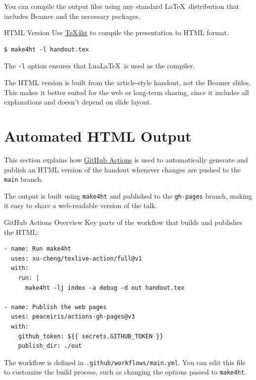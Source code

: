 You can compile the output files using any standard \LaTeX\ distribution that includes Beamer and the necessary packages.

\begin{frame}[fragile]{HTML Version}
  Use \href{https://www.tug.org/tex4ht/}{\TeX4ht} to compile the presentation to HTML format. 
\begin{verbatim}
$ make4ht -l handout.tex    
\end{verbatim}

The \verb|-l| option  ensures that Lua\LaTeX\ is used as the compiler. 
\end{frame}


The HTML version is built from the article-style handout, not the Beamer slides.
This makes it better suited for the web or long-term sharing, since it includes
all explanations and doesn’t depend on slide layout.

\section{Automated HTML Output}

This section explains how \href{https://docs.github.com/en/actions/writing-workflows/quickstart}{GitHub Actions}
is used to automatically generate and publish an HTML version of the handout whenever changes are pushed to the \texttt{main} branch.

The output is built using \texttt{make4ht} and published to the \texttt{gh-pages} branch,
making it easy to share a web-readable version of the talk.

\begin{frame}[fragile]{GitHub Actions Overview}
Key parts of the workflow that builds and publishes the HTML:

\begin{verbatim}
- name: Run make4ht
  uses: xu-cheng/texlive-action/full@v1
  with:
    run: |
      make4ht -lj index -a debug -d out handout.tex

- name: Publish the web pages
  uses: peaceiris/actions-gh-pages@v3
  with:
    github_token: ${{ secrets.GITHUB_TOKEN }}
    publish_dir: ./out
\end{verbatim}

\end{frame}


The workflow is defined in \texttt{.github/workflows/main.yml}.
You can edit this file to customize the build process, such as changing the options passed to \texttt{make4ht}.


